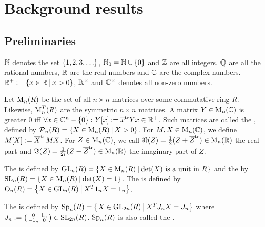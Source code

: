 
\section{Background results}

\subsection{Preliminaries}

$\mathbb{N}$ denotes the set $\Set{1,2,3,\dots}$, $\N_0 = \N \cup \Set{0}$ and $\mathbb{Z}$ are all integers. $\mathbb{Q}$ are all the rational numbers, $\mathbb{R}$ are the real numbers and $\mathbb{C}$ are the complex numbers. $\R^+ := \Set{x\in\R}{x>0}$, $\mathbb{R}^\times$ and $\mathbb{C}^\times$ denotes all non-zero numbers.

Let $\operatorname{M}_n(R)$ be the set of all $n \times n$ matrices over some commutative ring $R$.
Likewise, $\operatorname{M}_n^T(R)$ are the symmetric $n \times n$ matrices.
A matrix $Y \in \operatorname{M}_n(\mathbb{C})$ is greater $0$ iff $\forall x \in \C^n - \Set{0} \colon Y[x] := \overline{x}^{\tr} Y x \in \R^+$. Such matrices are called the , defined by $\PM_n(R) = \Set{X \in \M_n(R)}{X > 0}$. For $M,X \in \operatorname{M}_n(\mathbb{C})$, we define $M[X] := \overline{X}^{\textup{\textrm{tr}}} M X$. For $Z \in \operatorname{M}_n(\mathbb{C})$, we call $\Re(Z) = \frac{1}{2} (Z + \overline{Z}^{\textup{\textrm{tr}}}) \in \operatorname{M}_n(\mathbb{R})$ the real part and $\Im(Z) = \frac{1}{2i} (Z - \overline{Z}^{\textup{\textrm{tr}}})  \in \operatorname{M}_n(\mathbb{R})$ the imaginary part of $Z$.

The  is defined by $\GL_n(R) = \Set{X \in \M_n(R)}{\text{$\det(X)$ is a unit in $R$}}$
and the  by $\SL_n(R) = \Set{X \in \M_n(R)}{\det(X) = 1}$. %
The  is defined by $\Orth_n(R) = \Set{X \in \GL_n(R)}{X^T 1_n X = 1_n}$. %

The  is defined by $\Sp_n(R) = \Set{X \in \GL_{2n}(R)}{X^T J_n X = J_n}$ %
where $J_n := \left( \begin{smallmatrix} 0 & 1_n \\ -1_n & 0 \end{smallmatrix} \right) \in \operatorname{SL}_{2n}(R)$. %
$\operatorname{Sp}_n(R)$ is also called the .

